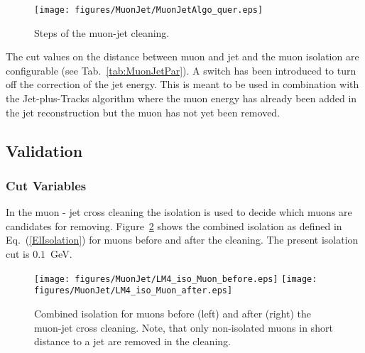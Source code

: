 \documentclass{cmspaper}
\begin{document}
\begin{figure}[hbt]
\begin{center}
\texttt{[image: figures/MuonJet/MuonJetAlgo\_quer.eps]}
\caption{Steps of the muon-jet cleaning.}
\label{fig:MJCleaning}
\end{center}
\end{figure}

The cut values on the distance between muon and jet and the muon isolation are configurable (see
Tab.~\ref{tab:MuonJetPar}). A switch has been introduced to turn off the
correction of the jet energy. This is meant to be used in combination with the
Jet-plus-Tracks algorithm where the muon energy has already been added in the
jet reconstruction but the muon has not yet been removed.

\subsection{Validation}
\subsubsection{Cut Variables}
In the muon - jet cross cleaning the isolation is used to decide which muons
are candidates for removing. Figure~\ref{fig:MuonIsolation} shows the combined
isolation as defined in Eq.~(\ref{ElIsolation}) for muons before and after the
cleaning. The present isolation cut is $0.1$~GeV. 

\begin{figure}[hb]
\begin{center}
    \texttt{[image: figures/MuonJet/LM4\_iso\_Muon\_before.eps]}
    \texttt{[image: figures/MuonJet/LM4\_iso\_Muon\_after.eps]}
    \caption{Combined isolation for muons before (left) and after (right) the
    muon-jet cross cleaning. Note, that only non-isolated muons in short
    distance to a jet are removed in the cleaning.}
\label{fig:MuonIsolation}
\end{center}
\end{figure}
\end{document}
